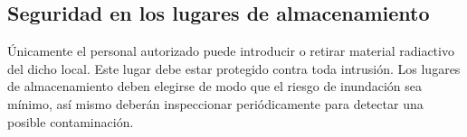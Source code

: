 \subsection*{Seguridad en los lugares de almacenamiento}
Únicamente el personal autorizado puede introducir o retirar material radiactivo del dicho local. Este lugar debe estar protegido contra toda intrusión.
Los lugares de almacenamiento deben elegirse de modo que el riesgo de inundación sea mínimo, así mismo deberán inspeccionar periódicamente para detectar una posible contaminación.